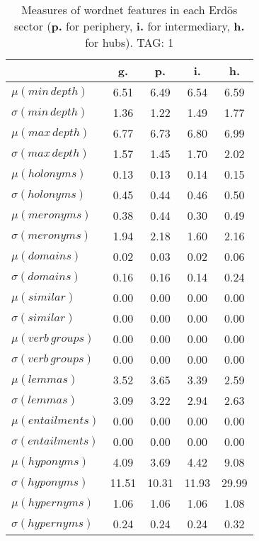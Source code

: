 \begin{table}[h!]
\begin{center}
\begin{tabular}{| l || c | c | c | c |}\hline
 & {\bf g.} & {\bf p.} & {\bf i.} & {\bf h.} \\\hline\hline
$\mu(min\,depth)$ & 6.51  & 6.49  & 6.54  & 6.59 \\
$\sigma(min\,depth)$ & 1.36  & 1.22  & 1.49  & 1.77 \\\hline
$\mu(max\,depth)$ & 6.77  & 6.73  & 6.80  & 6.99 \\
$\sigma(max\,depth)$ & 1.57  & 1.45  & 1.70  & 2.02 \\\hline
$\mu(holonyms)$ & 0.13  & 0.13  & 0.14  & 0.15 \\
$\sigma(holonyms)$ & 0.45  & 0.44  & 0.46  & 0.50 \\\hline
$\mu(meronyms)$ & 0.38  & 0.44  & 0.30  & 0.49 \\
$\sigma(meronyms)$ & 1.94  & 2.18  & 1.60  & 2.16 \\\hline
$\mu(domains)$ & 0.02  & 0.03  & 0.02  & 0.06 \\
$\sigma(domains)$ & 0.16  & 0.16  & 0.14  & 0.24 \\\hline
$\mu(similar)$ & 0.00  & 0.00  & 0.00  & 0.00 \\
$\sigma(similar)$ & 0.00  & 0.00  & 0.00  & 0.00 \\\hline
$\mu(verb\,groups)$ & 0.00  & 0.00  & 0.00  & 0.00 \\
$\sigma(verb\,groups)$ & 0.00  & 0.00  & 0.00  & 0.00 \\\hline
$\mu(lemmas)$ & 3.52  & 3.65  & 3.39  & 2.59 \\
$\sigma(lemmas)$ & 3.09  & 3.22  & 2.94  & 2.63 \\\hline
$\mu(entailments)$ & 0.00  & 0.00  & 0.00  & 0.00 \\
$\sigma(entailments)$ & 0.00  & 0.00  & 0.00  & 0.00 \\\hline
$\mu(hyponyms)$ & 4.09  & 3.69  & 4.42  & 9.08 \\
$\sigma(hyponyms)$ & 11.51  & 10.31  & 11.93  & 29.99 \\\hline
$\mu(hypernyms)$ & 1.06  & 1.06  & 1.06  & 1.08 \\
$\sigma(hypernyms)$ & 0.24  & 0.24  & 0.24  & 0.32 \\\hline
\end{tabular}
\caption{Measures of wordnet features in each Erd\"os sector ({{\bf p.}} for periphery, {{\bf i.}} for intermediary, {{\bf h.}} for hubs). TAG: 1}
\end{center}
\end{table}